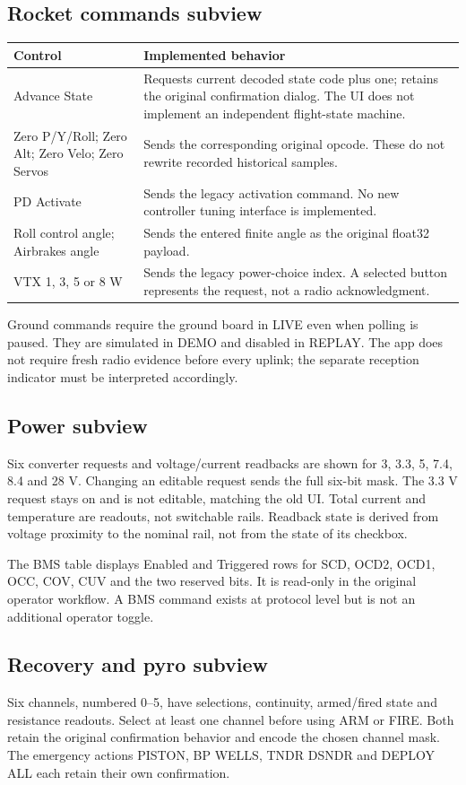 \subsection{Rocket commands subview}
\begin{longtable}{@{}L{.28\linewidth}L{.65\linewidth}@{}}
\toprule Control & Implemented behavior \\\midrule\endhead
Advance State & Requests current decoded state code plus one; retains the original confirmation dialog. The UI does not implement an independent flight-state machine. \\
Zero P/Y/Roll; Zero Alt; Zero Velo; Zero Servos & Sends the corresponding original opcode. These do not rewrite recorded historical samples. \\
PD Activate & Sends the legacy activation command. No new controller tuning interface is implemented. \\
Roll control angle; Airbrakes angle & Sends the entered finite angle as the original float32 payload. \\
VTX 1, 3, 5 or 8 W & Sends the legacy power-choice index. A selected button represents the request, not a radio acknowledgment. \\
\bottomrule
\end{longtable}
Ground commands require the ground board in LIVE even when polling is paused.
They are simulated in DEMO and disabled in REPLAY. The app does not require
fresh radio evidence before every uplink; the separate reception indicator must
be interpreted accordingly.

\subsection{Power subview}
Six converter requests and voltage/current readbacks are shown for 3, 3.3, 5,
7.4, 8.4 and 28 V. Changing an editable request sends the full six-bit mask.
The 3.3 V request stays on and is not editable, matching the old UI.
Total current and temperature are readouts, not switchable rails.
Readback state is derived from voltage proximity to the nominal rail, not from
the state of its checkbox.

The BMS table displays Enabled and Triggered rows for SCD, OCD2, OCD1, OCC,
COV, CUV and the two reserved bits. It is read-only in the original operator
workflow. A BMS command exists at protocol level but is not an additional
operator toggle.

\subsection{Recovery and pyro subview}
Six channels, numbered 0--5, have selections, continuity, armed/fired state and
resistance readouts. Select at least one channel before using ARM or FIRE.
Both retain the original confirmation behavior and encode the chosen channel
mask. The emergency actions PISTON, BP WELLS, TNDR DSNDR and DEPLOY ALL each
retain their own confirmation.

